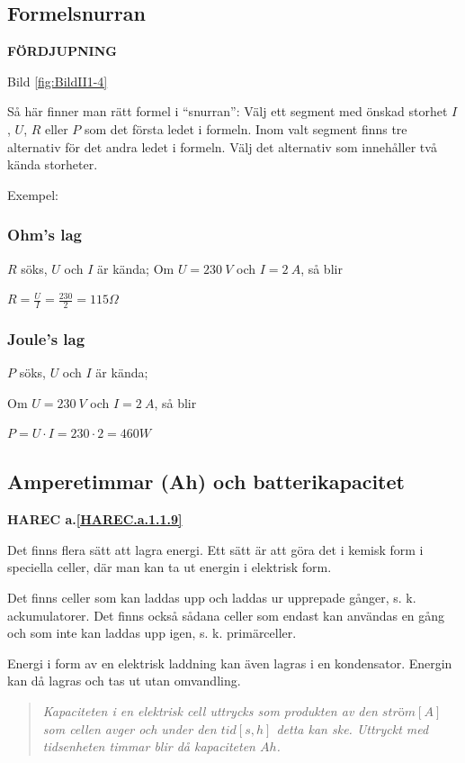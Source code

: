 \subsection{Formelsnurran}
\textbf{FÖRDJUPNING}

Bild \ref{fig:BildII1-4}

Så här finner man rätt formel i ``snurran'':
Välj ett segment med önskad storhet \(I\), \(U\), \(R\) eller \(P\) som det första
ledet i formeln. Inom valt segment finns tre alternativ för det andra
ledet i formeln. Välj det alternativ som innehåller två kända storheter.

Exempel:

\subsubsection{Ohm's lag}

\(R\) söks, \(U\) och \(I\) är kända;
Om \(U = 230\ V\) och \(I = 2\ A\), så blir

\(R=\frac{U}{I}=\frac{230}{2}=115 \Omega\)

\subsubsection{Joule's lag}

\(P\) söks, \(U\) och \(I\) är kända;

Om \(U = 230\ V\) och \(I = 2\ A\), så blir

\(P = U \cdot I = 230 \cdot 2 = 460 W\)

\subsection{Amperetimmar (Ah) och batterikapacitet}
\textbf{HAREC a.\ref{HAREC.a.1.1.9}\label{myHAREC.a.1.1.9}}

Det finns flera sätt att lagra energi. Ett sätt är att göra det i kemisk form i
speciella celler, där man kan ta ut energin i elektrisk form.

Det finns celler som kan laddas upp och laddas ur upprepade gånger, s. k.
ackumulatorer.
Det finns också sådana celler som endast kan användas en gång och som inte
kan laddas upp igen, s. k. primärceller.

Energi i form av en elektrisk laddning kan även lagras i en kondensator.
Energin kan då lagras och tas ut utan omvandling.

\begin{quote}\emph{
Kapaciteten i en elektrisk cell uttrycks som produkten av den \(ström [A]\) som
cellen avger och under den \(tid [s, h]\) detta kan ske.
Uttryckt med tidsenheten timmar blir då kapaciteten \(Ah\).
}\end{quote}

